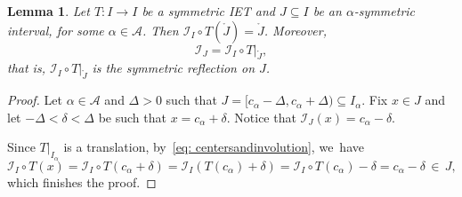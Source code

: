 \documentclass[10pt,a4paper]{article}
\theoremstyle{plain}
\newtheorem{lemma}[theorem]{Lemma}
\theoremstyle{definition}
\newcommand{\A}{\mathcal{A}}
\newcommand{\I}{\mathcal{I}}
\begin{document}
\begin{lemma}\label{lem: local_reflection}
Let $T : I \to I$ be a symmetric IET and $J \subseteq I$ be an $\alpha$-symmetric interval, for some $\alpha \in \A$. Then $\mathcal{I}_I\circ T(\mathring{J}) = \mathring{J}$. Moreover,
\[
\I_J = \mathcal{I}_I\circ T|_{\mathring{J}},
\]
that is, $\mathcal{I}_I\circ T|_{\mathring{J}}$ is the symmetric reflection on $J$.
\end{lemma}

\begin{proof}
Let $\alpha \in \A$ and $\Delta > 0$ such that $J = [c_\alpha - \Delta, c_\alpha + \Delta) \subseteq I_\alpha$. Fix $x\in J$ and let $-\Delta < \delta < \Delta$ be such that $x = c_{\alpha}+\delta$. Notice that $\I_J(x) = c_\alpha - \delta$.

Since $T|_{I_{\alpha}}$ is a translation, by~\eqref{eq: centersandinvolution}, we~have
\[
\I_I\circ T(x)=\I_I\circ T(c_{\alpha}+\delta)=\I_I\left(T(c_{\alpha}) +\delta\right)=
\I_I\circ T(c_{\alpha})-\delta=c_{\alpha}-\delta\,\in\, J,
\]
which finishes the proof.
\end{proof}
\end{document}
